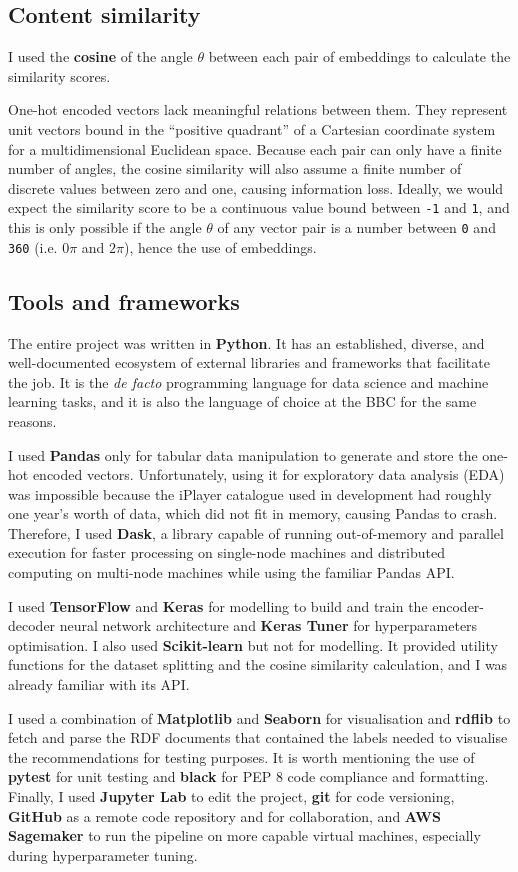 \subsection{Content similarity}

I used the \textbf{cosine} of the angle $\theta$ between each pair of embeddings to calculate the similarity scores.

One-hot encoded vectors lack meaningful relations between them.
They represent unit vectors bound in the ``positive quadrant'' of a Cartesian coordinate system for a multidimensional Euclidean space.
Because each pair can only have a finite number of angles,
the cosine similarity will also assume a finite number of discrete values between zero and one, causing information loss.
Ideally, we would expect the similarity score to be a continuous value bound between \verb|-1| and \verb|1|,
and this is only possible if the angle $\theta$ of any vector pair is a number between \verb|0| and \verb|360|
(i.e. $0\pi$ and $2\pi$), hence the use of embeddings.

\subsection{Tools and frameworks}

The entire project was written in \textbf{Python}.
It has an established, diverse, and well-documented ecosystem of external libraries and frameworks that facilitate the job.
It is the \textit{de facto} programming language for data science and machine learning tasks,
and it is also the language of choice at the BBC for the same reasons.

I used \textbf{Pandas} only for tabular data manipulation to generate and store the one-hot encoded vectors.
Unfortunately, using it for exploratory data analysis (EDA) was impossible
because the iPlayer catalogue used in development had roughly one year's worth of data,
which did not fit in memory, causing Pandas to crash.
Therefore, I used \textbf{Dask}, a library capable of running out-of-memory and parallel execution for faster processing
on single-node machines and distributed computing on multi-node machines while using the familiar Pandas API.

I used \textbf{TensorFlow} and \textbf{Keras} for modelling to build and train the encoder-decoder neural network architecture
and \textbf{Keras Tuner} for hyperparameters optimisation. I also used \textbf{Scikit-learn} but not for modelling.
It provided utility functions for the dataset splitting and the cosine similarity calculation,
and I was already familiar with its API.

I used a combination of \textbf{Matplotlib} and \textbf{Seaborn} for visualisation and \textbf{rdflib} to fetch and parse the RDF documents
that contained the labels needed to visualise the recommendations for testing purposes.
It is worth mentioning the use of \textbf{pytest} for unit testing and \textbf{black} for PEP 8 code compliance and formatting.
Finally, I used \textbf{Jupyter Lab} to edit the project, \textbf{git} for code versioning, \textbf{GitHub} as a remote code repository
and for collaboration, and \textbf{AWS Sagemaker} to run the pipeline on more capable virtual machines, especially during hyperparameter tuning.
